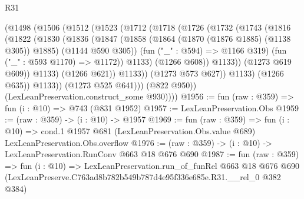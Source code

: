 \begin{lexlean}{R31}
\begin{coremodule}
                  (@1498
                    (@1506
                      (@1512
                        (@1523
                          (@1712
                            (@1718
                              (@1726
                                (@1732
                                  (@1743
                                    (@1816
                                      (@1822
                                        (@1830
                                          (@1836
                                            (@1847
                                              (@1858
                                                (@1864 (@1870 (@1876 @1885) (@1138 @305)) @1885)
                                                (@1144 @590 @305))
                                              (fun ("_" : @594) => @1166 @319)
                                              (fun ("_" : @593 @1170) => @1172))
                                            @1133)
                                          (@1266 @608))
                                        @1133))
                                    (@1273 @619 @609))
                                  @1133)
                                (@1266 @621))
                              @1133))
                          (@1273 @573 @627))
                        @1133)
                      (@1266 @635))
                    @1133))
                (@1273 @525 @641)))
            (@822 @950))
          (LexLeanPreservation.construct_some @930))))
@1956 := fun (raw : @359) => fun (i : @10) => @743 (@831 @1952)
@1957 := LexLeanPreservation.Obs
@1959 := (raw : @359) -> (i : @10) -> @1957
@1969 := fun (raw : @359) =>
  fun (i : @10) =>
  cond.{1} @1957 @681 (LexLeanPreservation.Obs.value @689) LexLeanPreservation.Obs.overflow
@1976 := (raw : @359) -> (i : @10) -> LexLeanPreservation.RunConv @663 @18 @676 @690
@1987 := fun (raw : @359) =>
  fun (i : @10) =>
  LexLeanPreservation.run_of_funRel
    @663
    @18
    @676
    @690
    (LexLeanPreserve.C763ad8b782b549b787d4e95f336e685e.R31.__rel_0 @382 @384)
\end{coremodule}
\end{lexlean}
